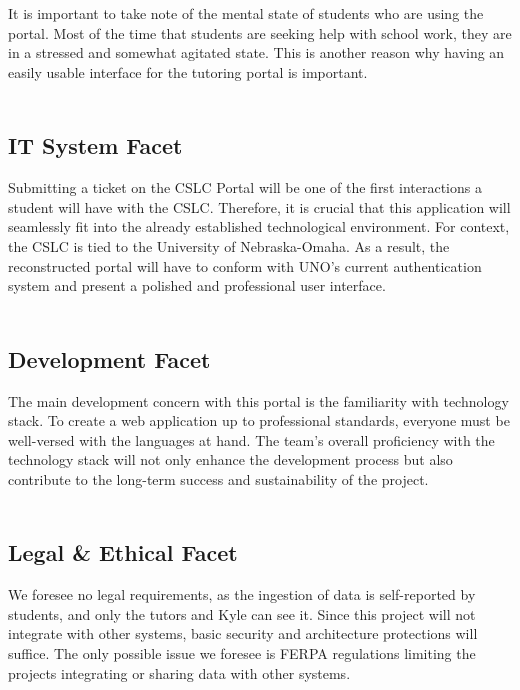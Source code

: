 \documentclass[oneside,openany,obeyspaces]{book}
\newcommand\tab[1][1cm]{\hspace*{#1}}
\begin{document}
\begin{flushleft}
    {\color{blue}\tab It is important to take note of the mental state of students who are using the portal. Most of the time that students are seeking help with school work, they are in a stressed and somewhat agitated state. This is another reason why having an easily usable interface for the tutoring portal is important. \\~\\}

    \subsection{IT System Facet}

    \tab Submitting a ticket on the CSLC Portal will be one of the first interactions a student will have with the CSLC. Therefore, it is crucial that this application will seamlessly fit into the already established technological environment. For context, the CSLC is tied to the University of Nebraska-Omaha. As a result, the reconstructed portal will have to conform with UNO's current authentication system and present a polished and professional user interface.\\~\\

    \subsection{Development Facet}

    \tab The main development concern with this portal is the familiarity with technology stack. To create a web application up to professional standards, everyone must be well-versed with the languages at hand. The team's overall proficiency with the technology stack will not only enhance the development process but also contribute to the long-term success and sustainability of the project.\\~\\

    \subsection{Legal \& Ethical Facet}

    \tab We foresee no legal requirements, as the ingestion of data is self-reported by students, and only the tutors and Kyle can see it. Since this project will not integrate with other systems, basic security and architecture protections will suffice. The only possible issue we foresee is FERPA regulations limiting the projects integrating or sharing data with other systems.\\~\\


\end{flushleft}
\end{document}
